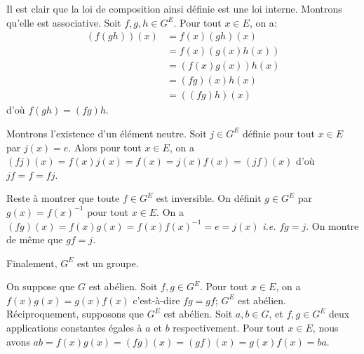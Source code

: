 Il est clair que la loi de composition ainsi définie est une loi interne.
Montrons qu'elle est associative. Soit $f,g,h\in G^E$. Pour tout $x\in E$, on
a:
%
\begin{align*}
  (f(gh))(x) &= f(x)(gh)(x) \\
             &= f(x)(g(x)h(x)) \\
             &= (f(x)g(x))h(x) \\
             &= (fg)(x)h(x) \\
             &= ((fg)h)(x)
\end{align*}
%
d'où $f(gh) = (fg)h$.

Montrons l'existence d'un élément neutre.  Soit $j\in G^E$ définie pour tout
$x\in E$ par $j(x)=e$. Alors pour tout $x\in E$, on a $(fj)(x) = f(x)j(x) =
f(x) = j(x)f(x) = (jf)(x)$ d'où  $jf = f = fj$.

Reste à montrer que toute $f\in G^E$ est inversible. On définit $g\in G^E$ par
$g(x) = f(x)^{-1}$ pour tout $x\in E$. On a $(fg)(x) = f(x)g(x) = f(x)f(x)^{-1}
= e = j(x)$ \textit{i.e.} $fg = j$. On montre de même que $gf = j$.

Finalement, $G^E$ est un groupe.

On suppose que $G$ est abélien. Soit $f,g\in G^E$. Pour tout $x\in E$, on a
$f(x)g(x) = g(x)f(x)$ c'est-à-dire $fg = gf$; $G^E$ est abélien. Réciproquement,
supposons que $G^E$ est abélien. Soit $a,b\in G$, et $f,g\in G^E$ deux
applications constantes égales à $a$ et $b$ respectivement. Pour tout $x\in E$,
nous avons $ab = f(x)g(x) = (fg)(x) = (gf)(x) = g(x)f(x) = ba$. 
